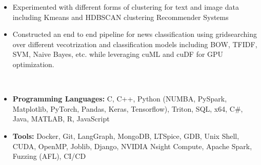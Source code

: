 \documentclass[letterpaper,11pt]{article}
\makeatletter
\newcommand{\resitem}[1]{\item #1 \vspace{-8pt}}
\newcommand{\resheading}[1]{\vspace{8pt}{\Large \textbf{#1}}\\\vspace{-8pt}\hrulefill}
\newcommand{\ressubheadingsmol}[2]{\vspace{1pt}
\begin{tabular*}{7.0in}{l@{\cftdotfill{\cftsecdotsep}\extracolsep{\fill}}r}
		\textbf{#1} & \textit{#2} \\
\end{tabular*}\vspace{-6pt}}
\makeatother
\begin{document}
\begin{itemize}
    \resitem{Experimented with  different forms of clustering for text and image data including Kmeans and  HDBSCAN clustering
Recommender Systems}
    \resitem{Constructed an end to end pipeline for news classification using gridsearching over different vecotrization and classification models including BOW, TFIDF, SVM, Naive Bayes, etc. while leveraging cuML and cuDF for GPU optimization.}
\end{itemize}

\resheading{Skills}
\begin{itemize}
\resitem{\textbf{Programming Languages:} C, C++, Python (NUMBA, PySpark, Matplotlib, PyTorch, Pandas, Keras, Tensorflow), Triton, SQL, x64, C\#, Java, MATLAB, R, JavaScript}
\resitem{\textbf{Tools:} Docker, Git, LangGraph, MongoDB, LTSpice, GDB, Unix Shell, CUDA, OpenMP, Joblib, Django, NVIDIA Nsight Compute, Apache Spark, Fuzzing (AFL), CI/CD}
\end{itemize}
\end{document}
